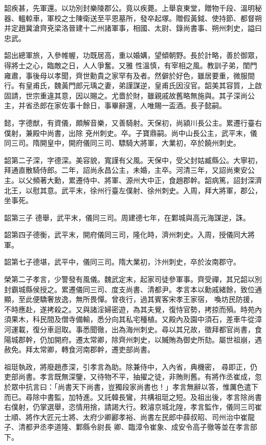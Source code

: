 \begin{pinyinscope}
 韶疾甚，先軍還。以功別封樂陵郡公。竟以疾薨。上舉哀東堂，贈物千段、溫明秘器、轀輬車，軍校之士陳衛送至平恩墓所，發卒起塚。贈假黃鉞、使持節、都督朔并定趙冀滄齊兗梁洛晉建十二州諸軍事，相國、太尉、錄尚書事、朔州刺史，謚曰忠武。



 韶出總軍旅，入參帷幄，功既居高，重以婚媾，望傾朝野。長於計略，善於御眾，得將士之心，臨敵之日，人人爭奮。又雅
 性溫慎，有宰相之風。教訓子弟，閨門雍肅，事後母以孝聞，齊世勳貴之家罕有及者。然僻於好色，雖居要重，微服間行。有皇甫氏，魏黃門郎元瑀之妻，弟謹謀逆，皇甫氏因沒官。韶美其容質，上啟固請，世宗重違其意，因以賜之。尤嗇於財，雖親戚故舊略無施與。其子深尚公主，并省丞郎在家佐事十餘日，事畢辭還，人唯賜一盃酒。長子懿嗣。



 懿，字德猷，有資儀，頗解音樂，又善騎射。天保初，尚潁川長公主。累遷行臺右僕射，兼殿中尚書，出除
 兗州刺史。卒。子寶鼎嗣。尚中山長公主，武平末，儀同三司。隋開皇中，開府儀同三司、驃騎大將軍，大業初，卒於饒州刺史。



 韶第二子深，字德深。美容貌，寬謹有父風。天保中，受父封姑臧縣公。大寧初，拜通直散騎侍郎。二年，詔尚永昌公主，未婚，主卒。河清三年，又詔尚東安公主。以父頻著大勳，累遷侍中、將軍、源州大中正，食趙郡幹。韶病篤，詔封深濟北王，以慰其意。武平末，徐州行臺左僕射、徐州刺史。入周，拜大將軍，郡公，坐事死。



 韶第三子
 德舉，武平末，儀同三司。周建德七年，在鄴城與高元海謀逆，誅。



 韶第四子德衡，武平末，開府儀同三司，隆化時，濟州刺史。入周，授儀同大將軍。



 韶第七子德堪，武平中，儀同三司。隋大業初，汴州刺史，卒於汝南郡守。



 榮第二子孝言，少警發有風儀。魏武定末，起家司徒參軍事。齊受禪，其兄韶以別封霸城縣侯授之。累遷儀同三司、度支尚書、清都尹。孝言本以勳戚緒餘，致位通顯，至此便驕奢放逸，無所畏憚。曾夜行，過其賓客宋孝王家宿，
 喚坊民防援，不時應赴，遂拷殺之。又與諸淫婦密遊，為其夫覺，復恃官勢，拷掠而殞。時苑內須果木，科民間及僧寺備輸，悉分向其私宅種植。又殿內及園中須石，差車牛從漳河運載，復分車迴取。事悉聞徹，出為海州刺史。尋以其兄故，徵拜都官尚書，食陽城郡幹，仍加開府。遷太常卿，除齊州刺史，以贓賄為御史所劾。屬世祖崩，遇赦免。拜太常卿，轉食河南郡幹，遷吏部尚書。



 祖珽執政，將廢趙彥深，引孝言為助。除兼侍中，入內省，典機密，
 尋即正，仍吏部尚書。孝言既無深鑒，又待物不平，抽擢之徒，非賄則舊。有將作丞崔成，忽於眾中抗言曰：「尚書天下尚書，豈獨段家尚書也！」孝言無辭以答，惟厲色遣下而已。尋除中書監，加特進。又託韓長鸞，共構祖珽之短。及祖出後，孝言除尚書右僕射，仍掌選舉，恣情用捨，請謁大行。敕濬京城北隍，孝言監作，儀同三司崔士順、將作大匠元士將、太府少卿酈孝裕、尚書左民郎中薛叔昭、司州治中崔龍子、清都尹丞李道隆、鄴縣令尉長
 卿、臨漳令崔象、成安令高子徹等並在孝言部下。




\end{pinyinscope}
